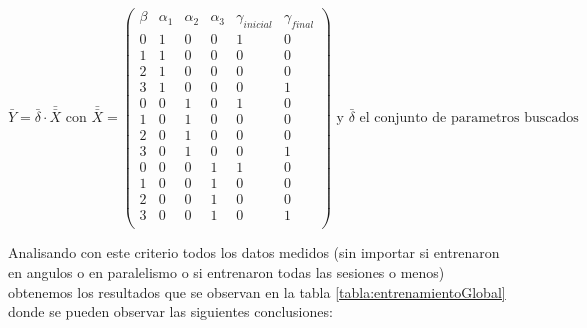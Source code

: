 \documentclass{article}
\begin{document}
\begin{equation} \label{ec:MatrixExpandida}
    \bar {Y} = \bar{\delta} \cdot \bar{\bar{X}} \text{ con } \bar{\bar{X}} =
     \begin{pmatrix}
        \beta & \alpha_1 & \alpha_2 & \alpha_3 & \gamma_{inicial} & \gamma_{final} \\
        0 & 1 & 0 & 0 & 1 & 0\\
        1 & 1 & 0 & 0 & 0 & 0\\
        2 & 1 & 0 & 0 & 0 & 0\\
        3 & 1 & 0 & 0 & 0 & 1\\
        0 & 0 & 1 & 0 & 1 & 0\\
        1 & 0 & 1 & 0 & 0 & 0\\
        2 & 0 & 1 & 0 & 0 & 0\\
        3 & 0 & 1 & 0 & 0 & 1\\
        0 & 0 & 0 & 1 & 1 & 0\\
        1 & 0 & 0 & 1 & 0 & 0\\
        2 & 0 & 0 & 1 & 0 & 0\\
        3 & 0 & 0 & 1 & 0 & 1\\
     \end{pmatrix} \text{ y $\bar{\delta}$ el conjunto de parametros buscados}
 \end{equation}

Analisando con este criterio todos los datos medidos (sin importar si entrenaron en angulos o en paralelismo o si entrenaron todas las sesiones o menos) obtenemos los resultados que se observan en la tabla \ref{tabla:entrenamientoGlobal} donde se pueden observar las siguientes conclusiones:
\end{document}
